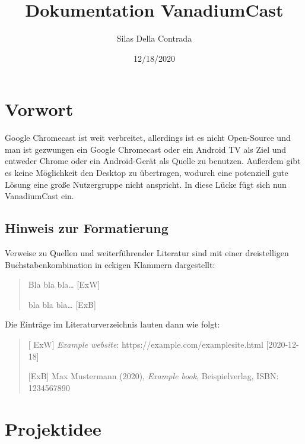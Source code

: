 \documentclass{article}
\title{Dokumentation VanadiumCast}
\author{Silas Della Contrada}
\date{12/18/2020}
\begin{document}
    \begin{titlingpage}
        \maketitle
    \end{titlingpage}

    \tableofcontents

    \newpage
    \linespread{1.25}


    \section{Vorwort}\label{sec:vorwort}

    Google Chromecast ist weit verbreitet, allerdings ist es nicht
    Open-Source und man ist gezwungen ein Google Chromecast oder ein Android
    TV als Ziel und entweder Chrome oder ein Android-Gerät als Quelle zu
    benutzen. Außerdem gibt es keine Möglichkeit den Desktop zu übertragen,
    wodurch eine potenziell gute Lösung eine große Nutzergruppe nicht
    anspricht. In diese Lücke fügt sich nun VanadiumCast ein.

    \subsection{Hinweis zur Formatierung}\label{sec:hinweis-zur-formatierung}

    Verweise zu Quellen und weiterführender Literatur sind mit einer
    dreistelligen Buchstabenkombination in eckigen Klammern dargestellt:

    \begin{quote}
        Bla bla bla\ldots{} {[}ExW{]}

        bla bla bla\ldots{} {[}ExB{]}
    \end{quote}
    Die Einträge im Literaturverzeichnis lauten dann wie folgt:

    \begin{quote}
    {[}
        ExW{]} \textit{Example website}: https://example.com/examplesite.html
        {[}2020-12-18{]}

        {[}ExB{]} Max Mustermann (2020), \textit{Example book}, Beispielverlag,
        ISBN: 1234567890
    \end{quote}

    \newpage


    \section{Projektidee}\label{sec:projektidee}
\end{document}
